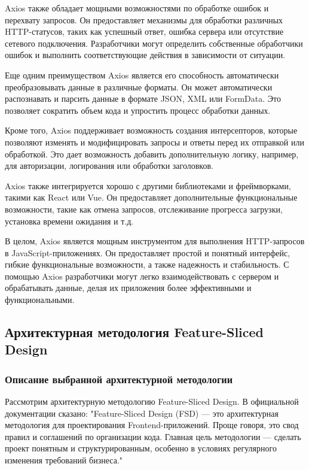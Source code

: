 Axios также обладает мощными возможностями по обработке ошибок и перехвату запросов. Он предоставляет механизмы для обработки различных HTTP-статусов, таких как успешный ответ, ошибка сервера или отсутствие сетевого подключения. Разработчики могут определить собственные обработчики ошибок и выполнить соответствующие действия в зависимости от ситуации.

Еще одним преимуществом Axios является его способность автоматически преобразовывать данные в различные форматы. Он может автоматически распознавать и парсить данные в формате JSON, XML или FormData. Это позволяет сократить объем кода и упростить процесс обработки данных.

Кроме того, Axios поддерживает возможность создания интерсепторов, которые позволяют изменять и модифицировать запросы и ответы перед их отправкой или обработкой. Это дает возможность добавить дополнительную логику, например, для авторизации, логирования или обработки заголовков.

Axios также интегрируется хорошо с другими библиотеками и фреймворками, такими как React или Vue. Он предоставляет дополнительные функциональные возможности, такие как отмена запросов, отслеживание прогресса загрузки, установка времени ожидания и т.д.

В целом, Axios является мощным инструментом для выполнения HTTP-запросов в JavaScript-приложениях. Он предоставляет простой и понятный интерфейс, гибкие функциональные возможности, а также надежность и стабильность. С помощью Axios разработчики могут легко взаимодействовать с сервером и обрабатывать данные, делая их приложения более эффективными и функциональными.

\subsection{Архитектурная методология Feature-Sliced Design}
\subsubsection{Описание выбранной архитектурной методологии}

Рассмотрим архитектурную методологию Feature-Sliced Design. В официальной документации сказано: "Feature-Sliced Design (FSD) — это архитектурная методология для проектирования Frontend-приложений. Проще говоря, это свод правил и соглашений по организации кода. Главная цель методологии — сделать проект понятным и структурированным, особенно в условиях регулярного изменения требований бизнеса."\cite{FSD}

